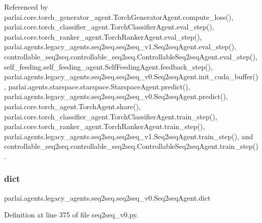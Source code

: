 Referenced by parlai.\+core.\+torch\+\_\+generator\+\_\+agent.\+Torch\+Generator\+Agent.\+compute\+\_\+loss(), parlai.\+core.\+torch\+\_\+classifier\+\_\+agent.\+Torch\+Classifier\+Agent.\+eval\+\_\+step(), parlai.\+core.\+torch\+\_\+ranker\+\_\+agent.\+Torch\+Ranker\+Agent.\+eval\+\_\+step(), parlai.\+agents.\+legacy\+\_\+agents.\+seq2seq.\+seq2seq\+\_\+v1.\+Seq2seq\+Agent.\+eval\+\_\+step(), controllable\+\_\+seq2seq.\+controllable\+\_\+seq2seq.\+Controllable\+Seq2seq\+Agent.\+eval\+\_\+step(), self\+\_\+feeding.\+self\+\_\+feeding\+\_\+agent.\+Self\+Feeding\+Agent.\+feedback\+\_\+step(), parlai.\+agents.\+legacy\+\_\+agents.\+seq2seq.\+seq2seq\+\_\+v0.\+Seq2seq\+Agent.\+init\+\_\+cuda\+\_\+buffer(), parlai.\+agents.\+starspace.\+starspace.\+Starspace\+Agent.\+predict(), parlai.\+agents.\+legacy\+\_\+agents.\+seq2seq.\+seq2seq\+\_\+v0.\+Seq2seq\+Agent.\+predict(), parlai.\+core.\+torch\+\_\+agent.\+Torch\+Agent.\+share(), parlai.\+core.\+torch\+\_\+classifier\+\_\+agent.\+Torch\+Classifier\+Agent.\+train\+\_\+step(), parlai.\+core.\+torch\+\_\+ranker\+\_\+agent.\+Torch\+Ranker\+Agent.\+train\+\_\+step(), parlai.\+agents.\+legacy\+\_\+agents.\+seq2seq.\+seq2seq\+\_\+v1.\+Seq2seq\+Agent.\+train\+\_\+step(), and controllable\+\_\+seq2seq.\+controllable\+\_\+seq2seq.\+Controllable\+Seq2seq\+Agent.\+train\+\_\+step().

\mbox{\label{classparlai_1_1agents_1_1legacy__agents_1_1seq2seq_1_1seq2seq__v0_1_1Seq2seqAgent_ad5ff9534948d32ca9b387fe1189174e6}} 
\subsubsection{\texorpdfstring{dict}{dict}}
{\footnotesize\ttfamily parlai.\+agents.\+legacy\+\_\+agents.\+seq2seq.\+seq2seq\+\_\+v0.\+Seq2seq\+Agent.\+dict}



Definition at line 375 of file seq2seq\+\_\+v0.\+py.



